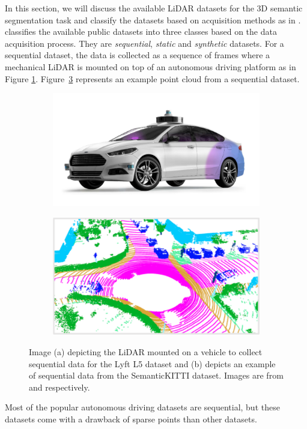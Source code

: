     In this section, we will discuss the available LiDAR datasets for the 3D semantic segmentation task and classify the datasets based on acquisition methods as in \cite{survey3d}.
    \cite{survey3d} classifies the available public datasets into three classes based on the data acquisition process.
    They are \textit{sequential}, \textit{static} and \textit{synthetic} datasets.
    For a sequential dataset, the data is collected as a sequence of frames where a mechanical LiDAR is mounted on top of an autonomous driving platform as in Figure \ref{fig:seq_data_lyft}.
    Figure~\ref{fig:example_sequential} represents an example point cloud from a sequential dataset.
    \begin{figure}[h!]
        \begin{subfigure}{0.45\textwidth}
            \centering
            \includegraphics[scale=0.25]{images/sequential_lyft.png}
            \caption{}
            \label{fig:seq_data_lyft}
        \end{subfigure}
        \begin{subfigure}{0.45\textwidth}
            \centering
            \includegraphics[scale=0.45]{images/SemanticKitti.pdf}
            \caption{}
            \label{fig:example_sequential}
        \end{subfigure}
        \caption{Image (a) depicting the LiDAR mounted on a vehicle to collect sequential data for the Lyft L5 dataset and 
        (b) depicts an example of sequential data from the SemanticKITTI dataset. Images are from \cite{Lyftl5} and \cite{Hu_2020_CVPR_Randla} respectively.}
        
    \end{figure}
    Most of the popular autonomous driving datasets are sequential, but these datasets come with a drawback of sparse points than other datasets.
    
